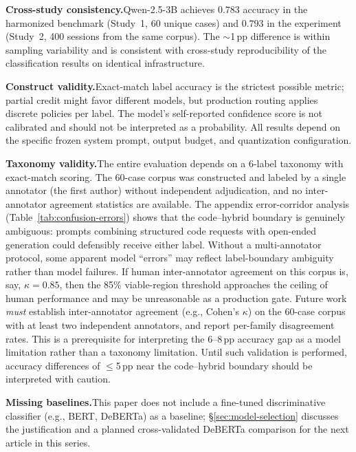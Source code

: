 \documentclass{article}
\begin{document}
\textbf{Cross-study consistency.}\quad Qwen-2.5-3B achieves $0.783$ accuracy in the harmonized benchmark (Study~1, 60 unique cases) and $0.793$ in the experiment (Study~2, 400 sessions from the same corpus). The $\sim$1\,pp difference is within sampling variability and is consistent with cross-study reproducibility of the classification results on identical infrastructure.

\textbf{Construct validity.}\quad Exact-match label accuracy is the strictest possible metric; partial credit might favor different models, but production routing applies discrete policies per label. The model's self-reported confidence score is not calibrated and should not be interpreted as a probability. All results depend on the specific frozen system prompt, output budget, and quantization configuration.

\textbf{Taxonomy validity.}\quad The entire evaluation depends on a 6-label taxonomy with exact-match scoring. The 60-case corpus was constructed and labeled by a single annotator (the first author) without independent adjudication, and no inter-annotator agreement statistics are available. The appendix error-corridor analysis (Table~\ref{tab:confusion-errors}) shows that the code--hybrid boundary is genuinely ambiguous: prompts combining structured code requests with open-ended generation could defensibly receive either label. Without a multi-annotator protocol, some apparent model ``errors'' may reflect label-boundary ambiguity rather than model failures. If human inter-annotator agreement on this corpus is, say, $\kappa = 0.85$, then the 85\% viable-region threshold approaches the ceiling of human performance and may be unreasonable as a production gate. Future work \emph{must} establish inter-annotator agreement (e.g., Cohen's $\kappa$) on the 60-case corpus with at least two independent annotators, and report per-family disagreement rates. This is a prerequisite for interpreting the 6--8\,pp accuracy gap as a model limitation rather than a taxonomy limitation. Until such validation is performed, accuracy differences of $\leq$5\,pp near the code--hybrid boundary should be interpreted with caution.

\textbf{Missing baselines.}\quad This paper does not include a fine-tuned discriminative classifier (e.g., BERT, DeBERTa) as a baseline; \S\ref{sec:model-selection} discusses the justification and a planned cross-validated DeBERTa comparison for the next article in this series.
\end{document}
